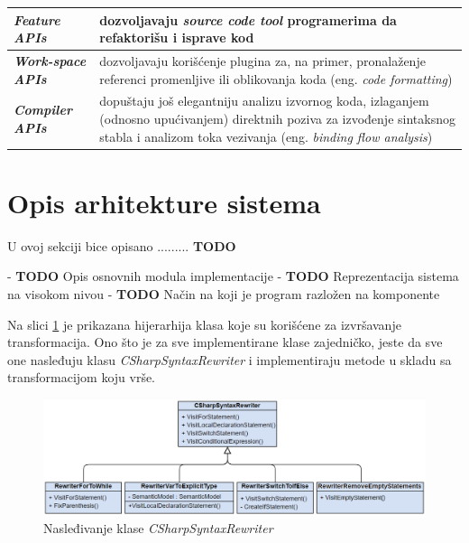 \documentclass[a4paper]{article}
\begin{document}
{		\begin{center}
			\label{tab:tabela} %
			\begin{tabular}{ | m{3cm} | m{6cm} | } 
				\hline
				\textbf{\textit{Feature APIs}} & dozvoljavaju \textit{source code tool} programerima da refaktorišu i isprave kod  \\ 
				\hline
				\textbf{\textit{Work-space APIs}} & dozvoljavaju korišćenje plugina za, na primer, pronalaženje referenci promenljive ili oblikovanja koda (eng. \textit{code formatting})  \\ 
				\hline
				\textbf{\textit{Compiler APIs}} & dopuštaju još elegantniju analizu izvornog koda, izlaganjem (odnosno upućivanjem) direktnih poziva za izvođenje sintaksnog stabla i analizom toka vezivanja (eng. \textit{binding flow analysis})  \\ 
				\hline
			\end{tabular}
		\end{center}
		
		
		
		\section{Opis arhitekture sistema}
		\label{sec:opis_arhitekture_sistema}
		
		U ovoj sekciji bice opisano ......... \textbf{TODO}
		
		\hfill
		
		- \textbf{TODO} Opis osnovnih modula implementacije
		- \textbf{TODO} Reprezentacija sistema na visokom nivou
		- \textbf{TODO} Način na koji je program razložen na komponente
		
		\hfill
		
		Na slici \ref{fig:CSharpSyntaxRewriter} je prikazana hijerarhija klasa koje su korišćene za izvršavanje transformacija. Ono što je za sve implementirane klase zajedničko, jeste da sve one nasleđuju klasu \textit{CSharpSyntaxRewriter} i implementiraju metode u skladu sa transformacijom koju vrše.
		
		\begin{figure}[!htb]
			\begin{center}
				\includegraphics[scale=0.5]{images/CSharpSyntaxRewriter.png}
			\end{center}
			\caption{Nasleđivanje klase \textit{CSharpSyntaxRewriter}}
			\label{fig:CSharpSyntaxRewriter}
		\end{figure}
		
}
\end{document}

